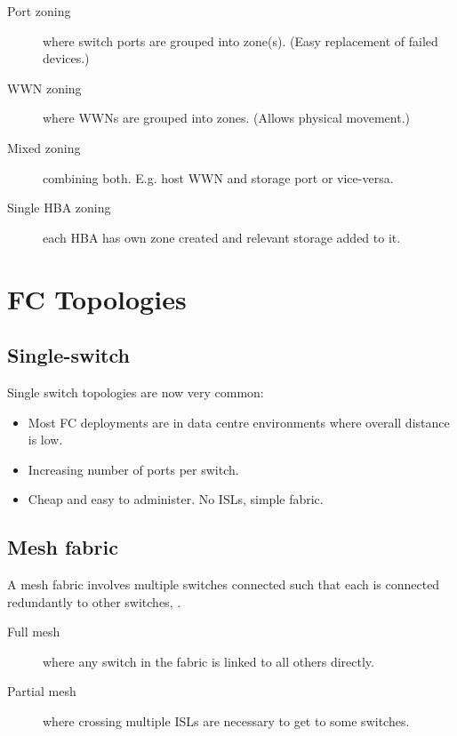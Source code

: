 \documentclass[slides]{pgnotes}
\begin{document}
\begin{description}
\item[Port zoning]
where switch ports are grouped into zone(s). (Easy replacement of failed
devices.)
\item[WWN zoning]
where WWNs are grouped into zones. (Allows physical movement.)
\item[Mixed zoning]
combining both. E.g. host WWN and storage port or vice-versa.
\item[Single HBA zoning]
each HBA has own zone created and relevant storage added to it.
\end{description}


\section{FC Topologies}
\label{sec:fc-topologies}


\subsection{Single-switch}
\label{sec:single-switch}

Single switch topologies are now very common:

\begin{itemize}
\item
  Most FC deployments are in data centre environments where overall
  distance is low.
\item
  Increasing number of ports per switch.
\item
  Cheap and easy to administer. No ISLs, simple fabric.
\end{itemize}

\subsection{Mesh fabric}
\label{sec:mesh-fabric}

A mesh fabric involves multiple switches connected such that each is
connected redundantly to other switches, .

\begin{description}
\item[Full mesh]
where any switch in the fabric is linked to all others directly.
\item[Partial mesh]
where crossing multiple ISLs are necessary to get to some switches.
\end{description}
\end{document}
